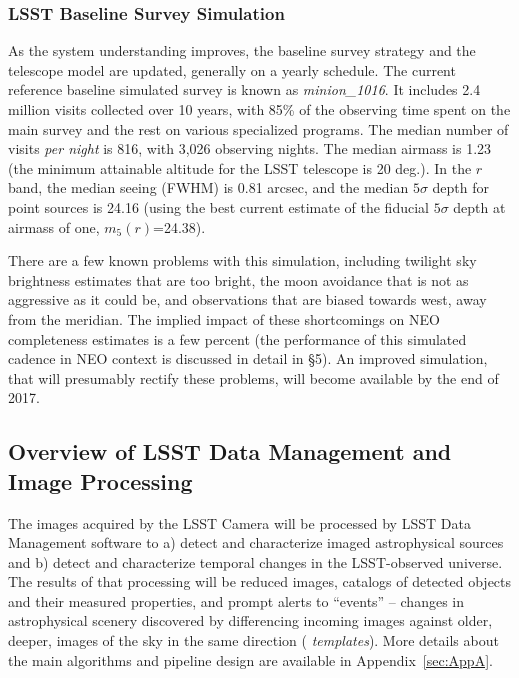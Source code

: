 \subsubsection{LSST Baseline Survey Simulation}

As the system understanding improves, the baseline survey strategy and the telescope model
are updated, generally on a yearly schedule. The current
reference baseline simulated survey is known as {\it minion\_1016}. It includes 2.4
million visits collected over 10 years, with 85\% of the observing time spent on the
main survey and the rest on various specialized programs. The median number of visits
{\it per night} is 816, with 3,026 observing nights. The median airmass is 1.23 (the
minimum attainable altitude for the LSST telescope is 20 deg.). In the $r$ band, the median
seeing (FWHM) is 0.81 arcsec, and the median $5\sigma$ depth for point sources is 24.16
(using the best current estimate of the fiducial $5\sigma$ depth at airmass of one, $m_5(r)$=24.38).

There are a few known problems with this simulation, including twilight sky brightness
estimates that are too bright, the moon avoidance that is not as aggressive as it could be,
and observations that are biased towards west, away from the meridian. The implied impact
of these shortcomings on NEO completeness estimates is a few percent (the performance
of this simulated cadence in NEO context is discussed in detail in \S5). An improved simulation,
that will presumably rectify these problems, will become available by the end of 2017.


\subsection{Overview of LSST  Data Management and Image Processing}

The images acquired by the LSST Camera will be processed by LSST Data Management
software \citep{juric15} to a) detect and characterize imaged
astrophysical sources and b) detect and characterize temporal changes
in the LSST-observed universe. The results of that processing will be
reduced images, catalogs of detected objects and their measured properties, and
prompt alerts to ``events'' -- changes in astrophysical scenery discovered by differencing
incoming images against older, deeper, images of the sky in the same direction ({\em
templates}). More details about the main algorithms and pipeline design are available
in Appendix~\ref{sec:AppA}.

